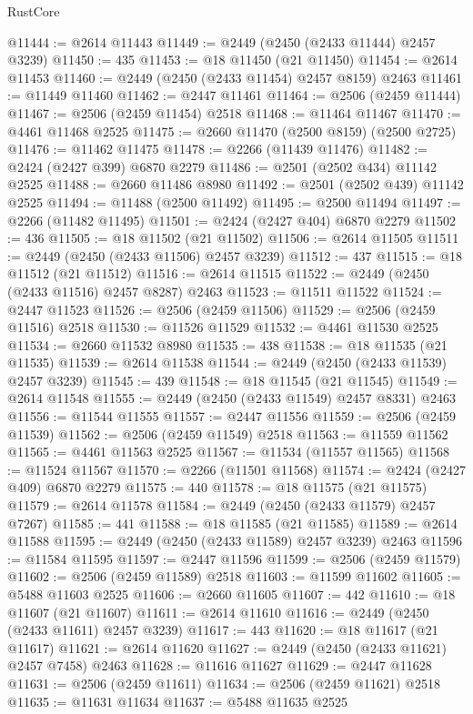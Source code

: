 \begin{lexlean}{RustCore}
\begin{coremodule}
@11444 := @2614 @11443
@11449 := @2449 (@2450 (@2433 @11444) @2457 @3239)
@11450 := 435
@11453 := @18 @11450 (@21 @11450)
@11454 := @2614 @11453
@11460 := @2449 (@2450 (@2433 @11454) @2457 @8159) @2463
@11461 := @11449 @11460
@11462 := @2447 @11461
@11464 := @2506 (@2459 @11444)
@11467 := @2506 (@2459 @11454) @2518
@11468 := @11464 @11467
@11470 := @4461 @11468 @2525
@11475 := @2660 @11470 (@2500 @8159) (@2500 @2725)
@11476 := @11462 @11475
@11478 := @2266 (@11439 @11476)
@11482 := @2424 (@2427 @399) @6870 @2279
@11486 := @2501 (@2502 @434) @11142 @2525
@11488 := @2660 @11486 @8980
@11492 := @2501 (@2502 @439) @11142 @2525
@11494 := @11488 (@2500 @11492)
@11495 := @2500 @11494
@11497 := @2266 (@11482 @11495)
@11501 := @2424 (@2427 @404) @6870 @2279
@11502 := 436
@11505 := @18 @11502 (@21 @11502)
@11506 := @2614 @11505
@11511 := @2449 (@2450 (@2433 @11506) @2457 @3239)
@11512 := 437
@11515 := @18 @11512 (@21 @11512)
@11516 := @2614 @11515
@11522 := @2449 (@2450 (@2433 @11516) @2457 @8287) @2463
@11523 := @11511 @11522
@11524 := @2447 @11523
@11526 := @2506 (@2459 @11506)
@11529 := @2506 (@2459 @11516) @2518
@11530 := @11526 @11529
@11532 := @4461 @11530 @2525
@11534 := @2660 @11532 @8980
@11535 := 438
@11538 := @18 @11535 (@21 @11535)
@11539 := @2614 @11538
@11544 := @2449 (@2450 (@2433 @11539) @2457 @3239)
@11545 := 439
@11548 := @18 @11545 (@21 @11545)
@11549 := @2614 @11548
@11555 := @2449 (@2450 (@2433 @11549) @2457 @8331) @2463
@11556 := @11544 @11555
@11557 := @2447 @11556
@11559 := @2506 (@2459 @11539)
@11562 := @2506 (@2459 @11549) @2518
@11563 := @11559 @11562
@11565 := @4461 @11563 @2525
@11567 := @11534 (@11557 @11565)
@11568 := @11524 @11567
@11570 := @2266 (@11501 @11568)
@11574 := @2424 (@2427 @409) @6870 @2279
@11575 := 440
@11578 := @18 @11575 (@21 @11575)
@11579 := @2614 @11578
@11584 := @2449 (@2450 (@2433 @11579) @2457 @7267)
@11585 := 441
@11588 := @18 @11585 (@21 @11585)
@11589 := @2614 @11588
@11595 := @2449 (@2450 (@2433 @11589) @2457 @3239) @2463
@11596 := @11584 @11595
@11597 := @2447 @11596
@11599 := @2506 (@2459 @11579)
@11602 := @2506 (@2459 @11589) @2518
@11603 := @11599 @11602
@11605 := @5488 @11603 @2525
@11606 := @2660 @11605
@11607 := 442
@11610 := @18 @11607 (@21 @11607)
@11611 := @2614 @11610
@11616 := @2449 (@2450 (@2433 @11611) @2457 @3239)
@11617 := 443
@11620 := @18 @11617 (@21 @11617)
@11621 := @2614 @11620
@11627 := @2449 (@2450 (@2433 @11621) @2457 @7458) @2463
@11628 := @11616 @11627
@11629 := @2447 @11628
@11631 := @2506 (@2459 @11611)
@11634 := @2506 (@2459 @11621) @2518
@11635 := @11631 @11634
@11637 := @5488 @11635 @2525

\end{coremodule}
\end{lexlean}
